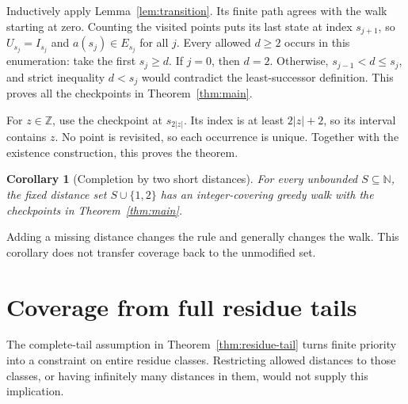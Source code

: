 \documentclass[11pt,a4paper]{article}
\newtheorem{corollary}[theorem]{Corollary}
\newcommand{\Z}{\mathbb Z}\newcommand{\N}{\mathbb N}
\begin{document}
Inductively apply Lemma~\ref{lem:transition}. Its finite path agrees with
the walk starting at zero. Counting the visited points puts its last state at
index $s_{j+1}$, so $U_{s_j}=I_{s_j}$ and $a(s_j)\in E_{s_j}$ for all $j$.
Every allowed $d\ge2$ occurs in this enumeration: take the first $s_j\ge d$.
If $j=0$, then $d=2$. Otherwise, $s_{j-1}<d\le s_j$, and strict inequality
$d<s_j$ would contradict the least-successor definition. This proves all
the checkpoints in Theorem~\ref{thm:main}.

For $z\in\Z$, use the checkpoint at $s_{2|z|}$. Its index is at least
$2|z|+2$, so its interval contains $z$. No point is revisited, so each occurrence is unique.
Together with the existence construction, this proves the theorem.

\begin{corollary}[Completion by two short distances]\label{cor:completion}
For every unbounded $S\subseteq\N$, the fixed distance set
$S\cup\{1,2\}$ has an integer-covering greedy walk with the checkpoints
in Theorem~\ref{thm:main}.
\end{corollary}
Adding a missing distance changes the rule and generally changes the walk.
This corollary does not transfer coverage back to the unmodified set.

\section{Coverage from full residue tails}\label{sec:residue-tail}
The complete-tail assumption in Theorem~\ref{thm:residue-tail} turns
finite priority into a constraint on entire residue classes. Restricting
allowed distances to those classes, or having infinitely many distances in
them, would not supply this implication.
\end{document}

